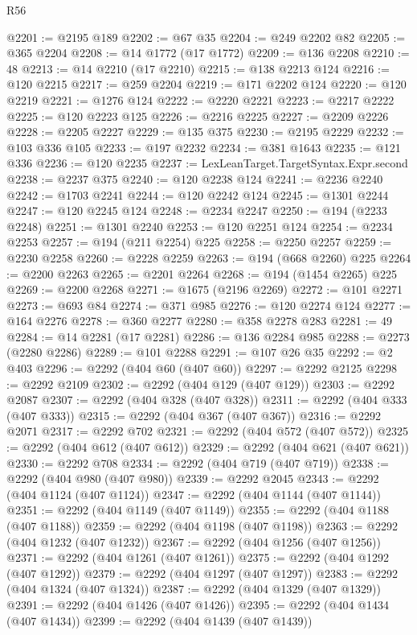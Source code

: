 \begin{lexlean}{R56}
\begin{coremodule}
@2201 := @2195 @189
@2202 := @67 @35
@2204 := @249 @2202 @82
@2205 := @365 @2204
@2208 := @14 @1772 (@17 @1772)
@2209 := @136 @2208
@2210 := 48
@2213 := @14 @2210 (@17 @2210)
@2215 := @138 @2213 @124
@2216 := @120 @2215
@2217 := @259 @2204
@2219 := @171 @2202 @124
@2220 := @120 @2219
@2221 := @1276 @124
@2222 := @2220 @2221
@2223 := @2217 @2222
@2225 := @120 @2223 @125
@2226 := @2216 @2225
@2227 := @2209 @2226
@2228 := @2205 @2227
@2229 := @135 @375
@2230 := @2195 @2229
@2232 := @103 @336 @105
@2233 := @197 @2232
@2234 := @381 @1643
@2235 := @121 @336
@2236 := @120 @2235
@2237 := LexLeanTarget.TargetSyntax.Expr.second
@2238 := @2237 @375
@2240 := @120 @2238 @124
@2241 := @2236 @2240
@2242 := @1703 @2241
@2244 := @120 @2242 @124
@2245 := @1301 @2244
@2247 := @120 @2245 @124
@2248 := @2234 @2247
@2250 := @194 (@2233 @2248)
@2251 := @1301 @2240
@2253 := @120 @2251 @124
@2254 := @2234 @2253
@2257 := @194 (@211 @2254) @225
@2258 := @2250 @2257
@2259 := @2230 @2258
@2260 := @2228 @2259
@2263 := @194 (@668 @2260) @225
@2264 := @2200 @2263
@2265 := @2201 @2264
@2268 := @194 (@1454 @2265) @225
@2269 := @2200 @2268
@2271 := @1675 (@2196 @2269)
@2272 := @101 @2271
@2273 := @693 @84
@2274 := @371 @985
@2276 := @120 @2274 @124
@2277 := @164 @2276
@2278 := @360 @2277
@2280 := @358 @2278 @283
@2281 := 49
@2284 := @14 @2281 (@17 @2281)
@2286 := @136 @2284 @985
@2288 := @2273 (@2280 @2286)
@2289 := @101 @2288
@2291 := @107 @26 @35
@2292 := @2 @403
@2296 := @2292 (@404 @60 (@407 @60))
@2297 := @2292 @2125
@2298 := @2292 @2109
@2302 := @2292 (@404 @129 (@407 @129))
@2303 := @2292 @2087
@2307 := @2292 (@404 @328 (@407 @328))
@2311 := @2292 (@404 @333 (@407 @333))
@2315 := @2292 (@404 @367 (@407 @367))
@2316 := @2292 @2071
@2317 := @2292 @702
@2321 := @2292 (@404 @572 (@407 @572))
@2325 := @2292 (@404 @612 (@407 @612))
@2329 := @2292 (@404 @621 (@407 @621))
@2330 := @2292 @708
@2334 := @2292 (@404 @719 (@407 @719))
@2338 := @2292 (@404 @980 (@407 @980))
@2339 := @2292 @2045
@2343 := @2292 (@404 @1124 (@407 @1124))
@2347 := @2292 (@404 @1144 (@407 @1144))
@2351 := @2292 (@404 @1149 (@407 @1149))
@2355 := @2292 (@404 @1188 (@407 @1188))
@2359 := @2292 (@404 @1198 (@407 @1198))
@2363 := @2292 (@404 @1232 (@407 @1232))
@2367 := @2292 (@404 @1256 (@407 @1256))
@2371 := @2292 (@404 @1261 (@407 @1261))
@2375 := @2292 (@404 @1292 (@407 @1292))
@2379 := @2292 (@404 @1297 (@407 @1297))
@2383 := @2292 (@404 @1324 (@407 @1324))
@2387 := @2292 (@404 @1329 (@407 @1329))
@2391 := @2292 (@404 @1426 (@407 @1426))
@2395 := @2292 (@404 @1434 (@407 @1434))
@2399 := @2292 (@404 @1439 (@407 @1439))

\end{coremodule}
\end{lexlean}
